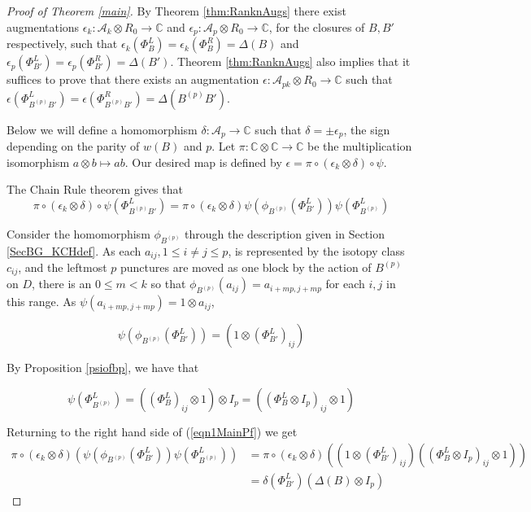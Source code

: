 \documentclass{amsart}[11pt,fullpage]
\def\C{{\mathbb C}}
\def\A{{\mathcal A}}
\theoremstyle{definition}
\begin{document}
\begin{proof}[Proof of Theorem \ref{main}]
By Theorem \ref{thm:RanknAugs} there exist augmentations $\epsilon_k\colon \A_k\otimes R_0 \rightarrow \C$ and $\epsilon_p\colon \A_p\otimes R_0 \rightarrow \C$, for the closures of $B,B'$ respectively, such that $\epsilon_k\left(\Phi_B^L\right) = \epsilon_k\left(\Phi_B^R\right) = \Delta(B)$ and $\epsilon_p\left(\Phi_{B'}^L\right) = \epsilon_p\left(\Phi_{B'}^R\right) = \Delta(B')$. Theorem \ref{thm:RanknAugs} also implies that it suffices to prove that there exists an augmentation $\epsilon\colon \A_{pk}\otimes R_0\rightarrow \C$ such that $\epsilon\left(\Phi_{B^{(p)}B'}^L\right) = \epsilon\left(\Phi_{B^{(p)}B'}^R\right) = \Delta(B^{(p)}B')$.

Below we will define a homomorphism $\delta\colon\A_p\rightarrow \C$ such that $\delta = \pm \epsilon_p$, the sign depending on the parity of $w(B)$ and $p$. Let $\pi\colon \C\otimes \C \rightarrow \C$ be the multiplication isomorphism $a\otimes b\mapsto ab$. Our desired map is defined by $\epsilon = \pi\circ(\epsilon_k\otimes\delta)\circ\psi$.

The Chain Rule theorem gives that
\begin{equation}
\pi\circ(\epsilon_k\otimes\delta)\circ\psi\left(\Phi_{B^{(p)}B'}^L\right) = \pi\circ(\epsilon_k\otimes\delta)\psi\left(\phi_{B^{(p)}}\left(\Phi_{B'}^L\right)\right)\psi\left(\Phi_{B^{(p)}}^L\right)
\label{eqn1MainPf}
\end{equation}

Consider the homomorphism $\phi_{B^{(p)}}$ through the description given in Section \ref{SecBG_KCHdef}. As each $a_{ij}, 1\le i\ne j\le p$, is represented by the isotopy class $c_{ij}$, and the leftmost $p$ punctures are moved as one block by the action of $B^{(p)}$ on $D$, there is an $0\le m<k$ so that $\phi_{B^{(p)}}(a_{ij})=a_{i+mp,j+mp}$ for each $i,j$ in this range. As $\psi(a_{i + mp, j+mp})=1\otimes a_{ij}$,

$$\psi\left(\phi_{B^{(p)}}\left(\Phi_{B'}^L\right)\right) = \left(1\otimes \left(\Phi_{B'}^L\right)_{ij}\right)$$

\noindent By Proposition \ref{psiofbp}, we have that 

$$\psi\left(\Phi_{B^{(p)}}^L\right) = \left(\left(\Phi_B^L\right)_{ij}\otimes 1\right)\otimes I_p = \left(\left(\Phi_B^L\otimes I_p\right)_{ij}\otimes 1\right)$$

\noindent Returning to the right hand side of (\ref{eqn1MainPf}) we get
\begin{align*}
\pi\circ(\epsilon_k\otimes\delta)\left(\psi\left(\phi_{B^{(p)}}\left(\Phi_{B'}^L\right)\right)\psi\left(\Phi_{B^{(p)}}^L\right)\right)
    & = \pi\circ(\epsilon_k\otimes\delta)\left(\left(1\otimes \left(\Phi_{B'}^L\right)_{ij}\right)\left(\left(\Phi_B^L\otimes I_p\right)_{ij}\otimes 1\right)\right)\\
    & = \delta\left(\Phi_{B'}^L\right)\left(\Delta(B)\otimes I_p\right)
\end{align*}



\end{proof}
\end{document}
